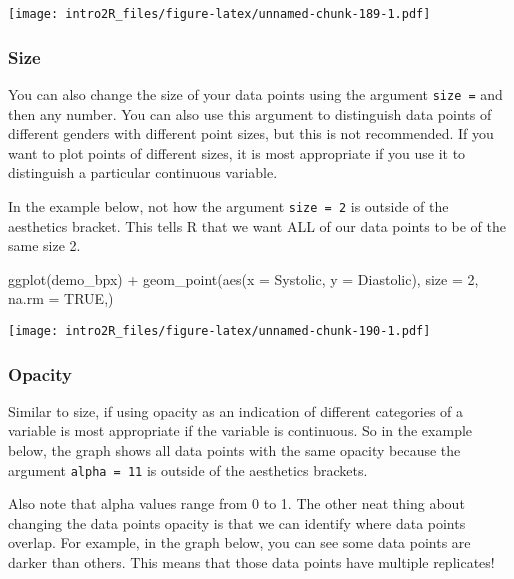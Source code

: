 \documentclass[
]{book}
\newenvironment{Shaded}{\begin{snugshade}}{\end{snugshade}}
\newcommand{\AttributeTok}[1]{\textcolor[rgb]{0.77,0.63,0.00}{#1}}
\newcommand{\ConstantTok}[1]{\textcolor[rgb]{0.00,0.00,0.00}{#1}}
\newcommand{\DecValTok}[1]{\textcolor[rgb]{0.00,0.00,0.81}{#1}}
\newcommand{\FunctionTok}[1]{\textcolor[rgb]{0.00,0.00,0.00}{#1}}
\newcommand{\NormalTok}[1]{#1}
\newcommand{\SpecialCharTok}[1]{\textcolor[rgb]{0.00,0.00,0.00}{#1}}
\begin{document}
\texttt{[image: intro2R\_files/figure-latex/unnamed-chunk-189-1.pdf]}

\hypertarget{size}{%
\subsubsection{Size}\label{size}}

You can also change the size of your data points using the argument \texttt{size\ =} and then any number. You can also use this argument to distinguish data points of different genders with different point sizes, but this is not recommended. If you want to plot points of different sizes, it is most appropriate if you use it to distinguish a particular continuous variable.

In the example below, not how the argument \texttt{size\ =\ 2} is outside of the aesthetics bracket. This tells R that we want ALL of our data points to be of the same size 2.

\begin{Shaded}
\begin{Highlighting}[]
\FunctionTok{ggplot}\NormalTok{(demo\_bpx) }\SpecialCharTok{+}
  \FunctionTok{geom\_point}\NormalTok{(}\FunctionTok{aes}\NormalTok{(}\AttributeTok{x =}\NormalTok{ Systolic, }\AttributeTok{y =}\NormalTok{ Diastolic),}
             \AttributeTok{size =} \DecValTok{2}\NormalTok{,}
             \AttributeTok{na.rm =} \ConstantTok{TRUE}\NormalTok{,)}
\end{Highlighting}
\end{Shaded}

\texttt{[image: intro2R\_files/figure-latex/unnamed-chunk-190-1.pdf]}

\hypertarget{opacity}{%
\subsubsection{Opacity}\label{opacity}}

Similar to size, if using opacity as an indication of different categories of a variable is most appropriate if the variable is continuous. So in the example below, the graph shows all data points with the same opacity because the argument \texttt{alpha\ =\ 11} is outside of the aesthetics brackets.

Also note that alpha values range from 0 to 1. The other neat thing about changing the data points opacity is that we can identify where data points overlap. For example, in the graph below, you can see some data points are darker than others. This means that those data points have multiple replicates!
\end{document}
